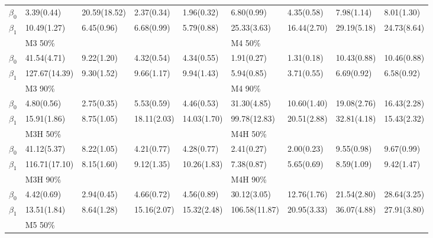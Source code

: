 \documentclass[12pt]{article}
\begin{document}
\begin{center}
\begin{table}[h]
\begin{tabular}[tb]{c|llll|llll}
      $\beta_0$ & 3.39(0.44)    & 20.59(18.52) & 2.37(0.34)  & 1.96(0.32)  & 6.80(0.99)    & 4.35(0.58)  & 7.98(1.14)  & 8.01(1.30)  \\
      $\beta_1$ & 10.49(1.27)   & 6.45(0.96)   & 6.68(0.99)  & 5.79(0.88)  & 25.33(3.63)   & 16.44(2.70) & 29.19(5.18) & 24.73(8.64) \\
      \hline
                & M3 50\%       &              &             &             & M4 50\%       &             &             &             \\
      $\beta_0$ & 41.54(4.71)   & 9.22(1.20)   & 4.32(0.54)  & 4.34(0.55)  & 1.91(0.27)    & 1.31(0.18)  & 10.43(0.88) & 10.46(0.88) \\
      $\beta_1$ & 127.67(14.39) & 9.30(1.52)   & 9.66(1.17)  & 9.94(1.43)  & 5.94(0.85)    & 3.71(0.55)  & 6.69(0.92)  & 6.58(0.92)  \\
                & M3 90\%       &              &             &             & M4 90\%       &             &             &             \\
      $\beta_0$ & 4.80(0.56)    & 2.75(0.35)   & 5.53(0.59)  & 4.46(0.53)  & 31.30(4.85)   & 10.60(1.40) & 19.08(2.76) & 16.43(2.28) \\
      $\beta_1$ & 15.91(1.86)   & 8.75(1.05)   & 18.11(2.03) & 14.03(1.70) & 99.78(12.83)  & 20.51(2.88) & 32.81(4.18) & 15.43(2.32) \\
      \hline
                & M3H 50\%      &              &             &             & M4H 50\%      &             &             &             \\
      $\beta_0$ & 41.12(5.37)   & 8.22(1.05)   & 4.21(0.77)  & 4.28(0.77)  & 2.41(0.27)    & 2.00(0.23)  & 9.55(0.98)  & 9.67(0.99)  \\
      $\beta_1$ & 116.71(17.10) & 8.15(1.60)   & 9.12(1.35)  & 10.26(1.83) & 7.38(0.87)    & 5.65(0.69)  & 8.59(1.09)  & 9.42(1.47)  \\
                & M3H 90\%      &              &             &             & M4H 90\%      &             &             &             \\
      $\beta_0$ & 4.42(0.69)    & 2.94(0.45)   & 4.66(0.72)  & 4.56(0.89)  & 30.12(3.05)   & 12.76(1.76) & 21.54(2.80) & 28.64(3.25) \\
      $\beta_1$ & 13.51(1.84)   & 8.64(1.28)   & 15.16(2.07) & 15.32(2.48) & 106.58(11.87) & 20.95(3.33) & 36.07(4.88) & 27.91(3.80) \\
      \hline
                & M5 50\%       &              &             &             &               &             &             &             \\

\end{tabular}
\end{table}
\end{center}
\end{document}
